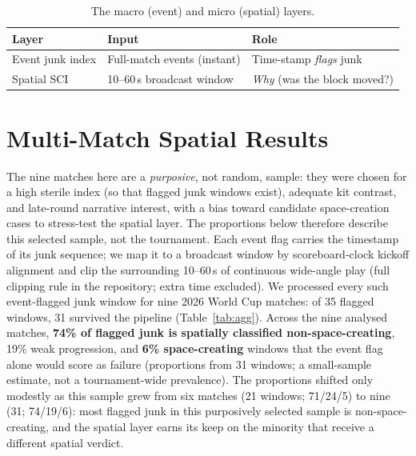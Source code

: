 \documentclass[11pt]{article}
\begin{document}
\begin{table}[t]
\centering
\small
\begin{tabular}{lll}
\toprule
Layer & Input & Role \\
\midrule
Event junk index & Full-match events (instant) & Time-stamp \emph{flags} junk \\
Spatial SCI      & 10--60\,s broadcast window   & \emph{Why} (was the block moved?) \\
\bottomrule
\end{tabular}
\caption{The macro (event) and micro (spatial) layers.}
\label{tab:layers}
\end{table}

\section{Multi-Match Spatial Results}
\label{sec:results}

The nine matches here are a \emph{purposive}, not random, sample: they were
chosen for a high sterile index (so that flagged junk windows exist), adequate
kit contrast, and late-round narrative interest, with a bias toward candidate
space-creation cases to stress-test the spatial layer. The proportions below
therefore describe this selected sample, not the tournament. Each event flag
carries the timestamp of its junk sequence; we map it to a broadcast window by
scoreboard-clock kickoff alignment and clip the surrounding 10--60\,s of
continuous wide-angle play (full clipping rule in the repository; extra time
excluded). We processed every such event-flagged junk window for nine 2026
World Cup matches: of 35 flagged windows, 31 survived the pipeline
(Table~\ref{tab:agg}). Across the nine analysed matches, \textbf{74\% of flagged junk is
spatially classified non-space-creating}, 19\% weak progression, and \textbf{6\%
space-creating} windows that the event flag alone would score as failure
(proportions from 31 windows; a small-sample estimate, not a tournament-wide
prevalence). The proportions shifted only modestly as this sample grew from six
matches (21 windows; 71/24/5) to nine (31; 74/19/6): most flagged junk in this
purposively selected sample is non-space-creating, and the spatial layer earns
its keep on the minority that receive a different spatial verdict.
\end{document}
